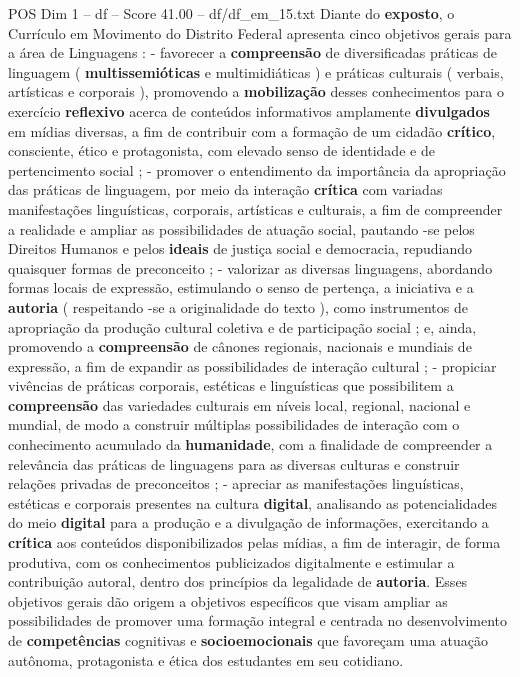 \begin{textsample}{POS Dim 1 – df – Score 41.00 – df/df\_em\_15.txt}
Diante do \textbf{exposto}, o Currículo em Movimento do Distrito Federal apresenta cinco objetivos gerais para a área de Linguagens : - favorecer a \textbf{compreensão} de diversificadas práticas de linguagem ( \textbf{multissemióticas} e multimidiáticas ) e práticas culturais ( verbais, artísticas e corporais ), promovendo a \textbf{mobilização} desses conhecimentos para o exercício \textbf{reflexivo} acerca de conteúdos informativos amplamente \textbf{divulgados} em mídias diversas, a fim de contribuir com a formação de um cidadão \textbf{crítico}, consciente, ético e protagonista, com elevado senso de identidade e de pertencimento social ; - promover o entendimento da importância da apropriação das práticas de linguagem, por meio da interação \textbf{crítica} com variadas manifestações linguísticas, corporais, artísticas e culturais, a fim de compreender a realidade e ampliar as possibilidades de atuação social, pautando -se pelos Direitos Humanos e pelos \textbf{ideais} de justiça social e democracia, repudiando quaisquer formas de preconceito ; - valorizar as diversas linguagens, abordando formas locais de expressão, estimulando o senso de pertença, a iniciativa e a \textbf{autoria} ( respeitando -se a originalidade do texto ), como instrumentos de apropriação da produção cultural coletiva e de participação social ; e, ainda, promovendo a \textbf{compreensão} de cânones regionais, nacionais e mundiais de expressão, a fim de expandir as possibilidades de interação cultural ; - propiciar vivências de práticas corporais, estéticas e linguísticas que possibilitem a \textbf{compreensão} das variedades culturais em níveis local, regional, nacional e mundial, de modo a construir múltiplas possibilidades de interação com o conhecimento acumulado da \textbf{humanidade}, com a finalidade de compreender a relevância das práticas de linguagens para as diversas culturas e construir relações privadas de preconceitos ; - apreciar as manifestações linguísticas, estéticas e corporais presentes na cultura \textbf{digital}, analisando as potencialidades do meio \textbf{digital} para a produção e a divulgação de informações, exercitando a \textbf{crítica} aos conteúdos disponibilizados pelas mídias, a fim de interagir, de forma produtiva, com os conhecimentos publicizados digitalmente e estimular a contribuição autoral, dentro dos princípios da legalidade de \textbf{autoria}.
Esses objetivos gerais dão origem a objetivos específicos que visam ampliar as possibilidades de promover uma formação integral e centrada no desenvolvimento de \textbf{competências} cognitivas e \textbf{socioemocionais} que favoreçam uma atuação autônoma, protagonista e ética dos estudantes em seu cotidiano.

\end{textsample}

